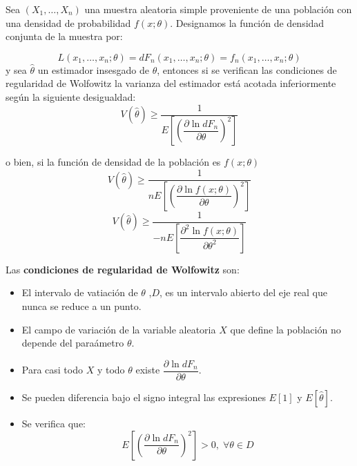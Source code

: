 \begin{teorema}
Sea $(X_1,\ldots,X_n)$ una muestra aleatoria simple proveniente de una poblaci\'on con una densidad de probabilidad $f(x;\theta)$. Designamos la funci\'on de densidad conjunta de la muestra por:

\begin{equation*}
L(x_1,\ldots,x_n;\theta)=dF_n(x_1,\ldots,x_n;\theta)=f_n(x_1,\ldots,x_n;\theta)
\end{equation*}
y sea $\hat{\theta}$ un estimador insesgado de $\theta$, entonces si se verifican las condiciones de regularidad de Wolfowitz la varianza del estimador est\'a acotada inferiormente seg\'un la siguiente desigualdad:
\begin{equation*}
V(\hat{\theta})\geq \dfrac{1}{E\left[\left(\dfrac{\partial\ln{dF_n}}{\partial\theta}\right)^2\right]}
\end{equation*}

o bien, si la funci\'on de densidad de la poblaci\'on es $f(x;\theta)$
\begin{equation*}
V(\hat{\theta})\geq \dfrac{1}{nE\left[\left(\dfrac{\partial\ln{f(x;\theta)}}{\partial\theta}\right)^2\right]}
\end{equation*}
\begin{equation*}
V(\hat{\theta})\geq \dfrac{1}{-nE\left[\dfrac{\partial^2\ln{f(x;\theta)}}{\partial\theta^2}\right]}
\end{equation*}
\end{teorema}

Las \textbf{condiciones de regularidad de Wolfowitz} son:
\begin{itemize}
\item El intervalo de vatiaci\'on de $\theta$ ,$D$, es un intervalo abierto del eje real que nunca se reduce a un punto.
\item El campo de variaci\'on de la variable aleatoria $X$ que define la poblaci\'on no depende del para\'ametro  $\theta$.
\item Para casi todo $X$ y todo  $\theta$ existe $\dfrac{\partial\ln{dF_n}}{\partial\theta}$.
\item Se pueden diferencia bajo el signo integral las expresiones $E[1]$ y $E[\hat{\theta}]$.
\item Se verifica que:
\begin{equation*}
E\left[\left(\dfrac{\partial\ln{dF_n}}{\partial\theta}\right)^2\right]>0,\;\forall\theta\in D
\end{equation*}
\end{itemize}

